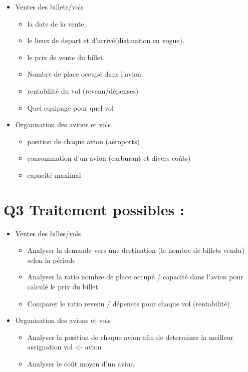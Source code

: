 \documentclass[oneside,13pt,a4paper]{article}
\begin{document}
\begin{itemize}
  \item Ventes des billets/vols
  \begin{itemize}
    \item la date de la vente.
    \item le lieux de depart et d'arrivé(distination en vogue).
    \item le prix de vente du billet.
    \item Nombre de place occupé dans l'avion.
    \item rentabilité du vol (revenu/dépenses)
    \item Quel equipage pour quel vol
  \end{itemize}
\end{itemize}
  \begin{itemize}
  \item Organisation des avions et vols
  \begin{itemize}
    \item position de chaque avion (aéroports)
    \item consommation d'un avion (carburant et divers coûts)
    \item capacité maximal
  \end{itemize}
\end{itemize}

\section{Q3 Traitement possibles : }

\begin{itemize}
  \item Ventes des billes/vols
  \begin{itemize}
    \item Analyser la demande vers une destination (le nombre de billets vendu) selon la période
    \item Analyser la ratio nombre de place occupé / capacité dans l'avion pour calculé le prix du billet
    \item Comparer le ratio revenu / dépenses pour chaque vol (rentabilité)
  \end{itemize}
\end{itemize}
  \begin{itemize}
  \item Organisation des avions et vols
  \begin{itemize}
    \item Analyser la position de chaque avion afin de determiner la meilleur assignation vol <- avion
    \item Analyser le coût moyen d'un avion
  \end{itemize}
\end{itemize}
\end{document}

